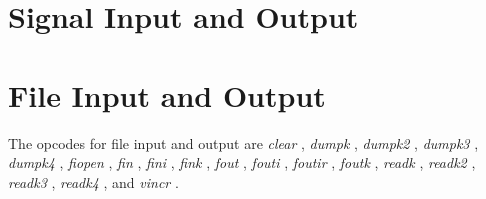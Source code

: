 \begin{comment}
\documentclass[10pt]{article}
\usepackage{fullpage, graphicx, url}
\setlength{\parskip}{1ex}
\setlength{\parindent}{0ex}
\title{Signal Input and Output}



\begin{tabular}{ccc}
The Alternative Csound Reference Manual & & \\
Previous & &Next

\end{tabular}

\end{comment}
\section{Signal Input and Output}
\section{File Input and Output}


  The opcodes for file input and output are \emph{clear}
, \emph{dumpk}
, \emph{dumpk2}
, \emph{dumpk3}
, \emph{dumpk4}
, \emph{fiopen}
, \emph{fin}
, \emph{fini}
, \emph{fink}
, \emph{fout}
, \emph{fouti}
, \emph{foutir}
, \emph{foutk}
, \emph{readk}
, \emph{readk2}
, \emph{readk3}
, \emph{readk4}
, and \emph{vincr}
. 


\begin{comment}
\begin{tabular}{lcr}
Previous &Home &Next \\
Waveguide Physical Modeling &Up &Input

\end{tabular}



\end{comment}
